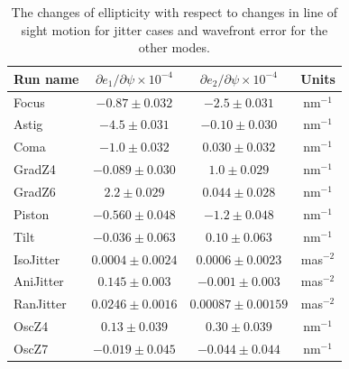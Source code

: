 \documentclass[usenatbib]{mnras}
\begin{document}
\begin{table}
\caption{The changes of ellipticity with respect to changes in line of sight motion for jitter cases and wavefront error for the other modes.\label{table:partials}}
\begin{center}
\begin{tabular}{ lccc }
\hline
\hline
Run name & $\partial e_1/\partial\psi \times 10^{-4}$ & $\partial e_2/\partial\psi \times 10^{-4}$ & Units \\
\hline
Focus           & $-0.87  \pm 0.032$   & $-2.5  \pm 0.031$ & nm$^{-1}$ \\
Astig           & $-4.5   \pm 0.031$   & $-0.10 \pm 0.030$  & nm$^{-1}$ \\
Coma            & $-1.0   \pm 0.032$   & $0.030 \pm 0.032$  & nm$^{-1}$ \\
GradZ4          & $-0.089 \pm 0.030$   & $1.0   \pm 0.029$  & nm$^{-1}$ \\
GradZ6          & $2.2    \pm 0.029$   & $0.044 \pm 0.028$  & nm$^{-1}$ \\
Piston 		    & $-0.560  \pm 0.048$  & $-1.2  \pm 0.048$  & nm$^{-1}$ \\
Tilt 			& $-0.036 \pm 0.063$   & $0.10  \pm 0.063$  & nm$^{-1}$ \\ \hline
IsoJitter 		& $  0.0004 \pm 0.0024$     & $0.0006  \pm 0.0023$ & mas$^{-2}$ \\
AniJitter 		& $0.145   \pm 0.003$  & $-0.001 \pm 0.003$ & mas$^{-2}$ \\
RanJitter 	    & $0.0246  \pm 0.0016$  & $0.00087  \pm 0.00159$ & mas$^{-2}$ \\ \hline
OscZ4 		    & $0.13   \pm 0.039$   & $0.30  \pm 0.039$  & nm$^{-1}$ \\
OscZ7 		    & $-0.019 \pm 0.045$   & $-0.044\pm 0.044$   & nm$^{-1}$ \\
\hline
\hline
\end{tabular}
\end{center}
\end{table}
\end{document}
